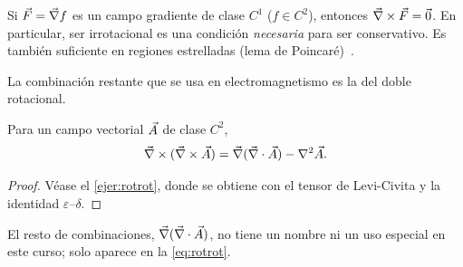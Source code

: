 \begin{corolario}\label{cor:grad-irrot}
Si $\vec{F}=\vec{\nabla} f$ es un campo gradiente de clase $C^{1}$ ($f\in C^{2}$), entonces
$\vec{\nabla}\times\vec{F}=\vec{0}$. En particular, ser irrotacional es una condición
\emph{necesaria} para ser conservativo. Es también suficiente en regiones
estrelladas (lema de Poincaré)~\cite{NAVAS}.
\end{corolario}

La combinación restante que se usa en electromagnetismo es la del doble
rotacional.

\begin{proposicion}\label{prop:rotrot}
Para un campo vectorial $\vec{A}$ de clase $C^{2}$,
\begin{equation}\label{eq:rotrot}
  \vec{\nabla}\times(\vec{\nabla}\times\vec{A})=\vec{\nabla}(\vec{\nabla}\cdot\vec{A})-\nabla^{2}\vec{A}.
\end{equation}
\end{proposicion}
\begin{proof}
Véase el \cref{ejer:rotrot}, donde se obtiene con el tensor de Levi-Civita y la
identidad $\varepsilon$--$\delta$.
\end{proof}

El resto de combinaciones, $\vec{\nabla}(\vec{\nabla}\cdot\vec{A})$, no tiene un nombre ni un uso
especial en este curso; solo aparece en la \cref{eq:rotrot}.
